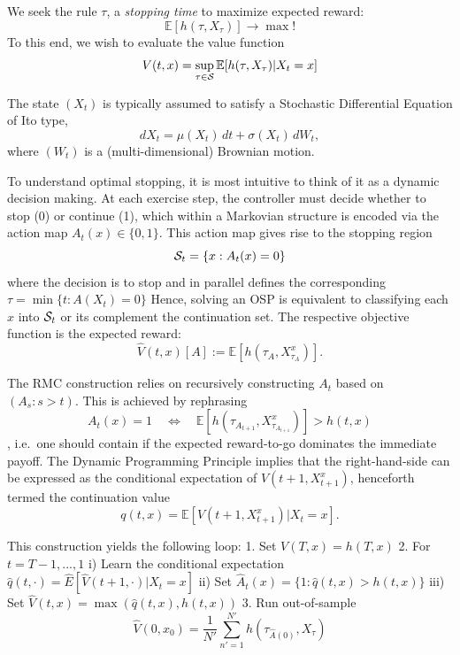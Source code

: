 \documentclass[]{article}
\begin{document}
We seek the rule \(\tau\), a \emph{stopping time} to maximize expected
reward: \[\mathbb{E}[ h(\tau,X_\tau) ] \rightarrow \max! \] To this end,
we wish to evaluate the value function
\[V(t,x) = \sup_{\tau \in \cal{S}} \mathbb{E}[ h(\tau, X_\tau) | X_t = x ]\]

The state \((X_t)\) is typically assumed to satisfy a Stochastic
Differential Equation of Ito type,
\[  dX_t = \mu(X_t) \, dt + \sigma(X_t)\, dW_t,\] where \((W_t)\) is a
(multi-dimensional) Brownian motion.

To understand optimal stopping, it is most intuitive to think of it as a
dynamic decision making. At each exercise step, the controller must
decide whether to stop (0) or continue (1), which within a Markovian
structure is encoded via the action map \(A_t(x) \in \{ 0,1 \}\). This
action map gives rise to the stopping region
\[ {\cal S}_t = \{ x : A_t(x) = 0\} \] where the decision is to stop and
in parallel defines the corresponding
\(\tau = \min \{ t: A(X_t) = 0 \}\) Hence, solving an OSP is equivalent
to classifying each \(x\) into \({\cal S}_t\) or its complement the
continuation set. The respective objective function is the expected
reward:
\[ \widehat{V}(t,x)[A] := \mathbb{E}[ h(\tau_A, X^x_{\tau_A})].\]

The RMC construction relies on recursively constructing \(A_t\) based on
\((A_s : s > t)\). This is achieved by rephrasing
\[ A_t(x) = 1 \quad \Leftrightarrow \quad \mathbb{E}[ h(\tau_{A_{t+1}}, X^x_{\tau_{A_{t+1}}})] > h(t,x) \],
i.e.~one should contain if the expected reward-to-go dominates the
immediate payoff. The Dynamic Programming Principle implies that the
right-hand-side can be expressed as the conditional expectation of
\(V(t+1, X^x_{t+1})\), henceforth termed the continuation value
\[ q(t,x) = \mathbb{E}[ V(t+1, X^x_{t+1}) | X_t =x]. \]

This construction yields the following loop: 1. Set \(V(T,x)=h(T,x)\) 2.
For \(t=T-1,...,1\) i) Learn the conditional expectation
\(\hat{q}(t,\cdot) = \hat{E}[ \hat{V}(t+1, \cdot) | X_t = x]\) ii) Set
\(\hat{A}_t(x) = \{ 1 : \hat{q}(t,x) > h(t,x) \}\) iii) Set
\(\hat{V}(t,x) = \max ( \hat{q}(t,x), h(t,x))\) 3. Run out-of-sample
\[ \hat{V}(0,x_0) = \frac{1}{N'} \sum_{n'=1}^{N'} h(\tau_{\hat{A}(0)}, X_\tau)\]
\end{document}
